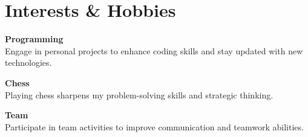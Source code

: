 \documentclass[a4paper,11pt]{article}  %
\begin{document}

\section*{Interests \& Hobbies}
\begin{multicols}{3}
\justifying
\textbf{Programming} \\
Engage in personal projects
to enhance coding skills and
stay updated with new technologies.

\columnbreak

\justifying
\textbf{Chess} \\
Playing chess sharpens my 
problem-solving skills and 
strategic thinking.

\columnbreak

\justifying
\textbf{Team} \\
Participate in team activities 
to improve communication 
and teamwork abilities.
\end{multicols}
\end{document}

